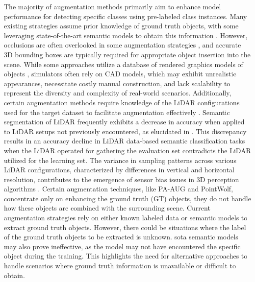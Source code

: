 The majority of augmentation methods primarily aim to enhance model performance for detecting specific classes using pre-labeled class instances. Many existing strategies assume prior knowledge of ground truth objects, with some leveraging state-of-the-art semantic models to obtain this information \parencite{rs_aug_2023}. However, occlusions are often overlooked in some augmentation strategies \parencite{second2018, xiao2022polarmix}, and accurate 3D bounding boxes are typically required for appropriate object insertion into the scene. While some approaches utilize a database of rendered graphics models of objects \parencite{second2018, rs_aug_2023}, simulators often rely on CAD models, which may exhibit unrealistic appearances, necessitate costly manual construction, and lack scalability to represent the diversity and complexity of real-world scenarios. Additionally, certain augmentation methods require knowledge of the LiDAR configurations used for the target dataset to facilitate augmentation effectively \parencite{9811816, dada_2023}. 
Semantic segmentation of LiDAR frequently exhibits a decrease in accuracy when applied to LiDAR setups not previously encountered, as elucidated in \parencite{10204248}. This discrepancy results in an accuracy decline in LiDAR data-based semantic classification tasks when the LiDAR operated for gathering the evaluation set contradicts the LiDAR utilized for the learning set. The variance in sampling patterns across various LiDAR configurations, characterized by differences in vertical and horizontal resolution, contributes to the emergence of sensor bias issues in 3D perception algorithms \parencite{survery_domain_adp_2021, domain_adp_appr_2020}. 
Certain augmentation techniques, like PA-AUG and PointWolf, concentrate only on enhancing the ground truth (GT) objects, they do not handle how these objects are combined with the surrounding scene. 
Current augmentation strategies rely on either known labeled data or semantic models to extract ground truth objects. However, there could be situations where the label of the ground truth objects to be extracted is unknown. \acrshort{sota} semantic models may also prove ineffective, as the model may not have encountered the specific object during the training. This highlights the need for alternative approaches to handle scenarios where ground truth information is unavailable or difficult to obtain.

